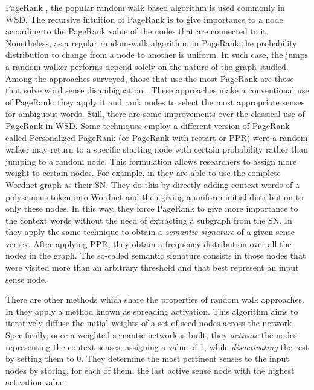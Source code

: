 PageRank \cite{Brin1998}, the popular random walk based algorithm is used commonly in WSD. The recursive intuition of PageRank is to give importance to a node according to the PageRank value of the nodes that are connected to it. %
Nonetheless, as a regular random-walk algorithm, in PageRank the probability distribution to change from a node to another is uniform. In such case, the jumps a random walker performs depend solely on the nature of the graph studied. Among the approaches surveyed, those that use the most PageRank are those that solve word sense disambiguation \cite{2004.Mihalcea.SemanticNetworkPageRank,2006.Agirre.TwoGraph-basedAlgorithms,2007.Navigli.GraphConnectivity,2010.Siberer.GraphCooccurrenceWSD}. 
%
These approaches make a conventional use of PageRank: they apply it and rank nodes to select the most appropriate senses for ambiguous words. Still, there are some improvements over the classical use of PageRank in WSD. Some techniques employ a different version of PageRank called Personalized PageRank (or PageRank with restart \cite{Murphy2012} or PPR) were a random walker may return to a specific starting node with certain probability rather than jumping to a random node. This formulation allows researchers to assign more weight to certain nodes. For example, in \cite{2009.Agirre.PersonalizedPageRankWSD} they are able to use the complete Wordnet graph as their SN. They do this by directly adding context words of a polysemous token into Wordnet and then giving a uniform initial distribution to only these nodes. In this way, they force PageRank to give more importance to the context words without the need of extracting a subgraph from the SN. In \cite{2014.Moro.Navigli.EntityLinking_WSD} they apply the same technique to obtain a \textit{semantic signature} of a given sense vertex. After applying PPR, they obtain a frequency distribution over all the  nodes in the graph. The so-called semantic signature consists in those nodes that were visited more than an arbitrary threshold and that best represent an input sense node.

There are other methods which share the properties of random walk approaches. In  \cite{2007.Tsatsaronis.WSDwithSpreading,2013.Kivimaki.AGraph-BasedApproach} they apply a method known as spreading activation. This algorithm aims to iteratively diffuse the initial weights of a set of seed nodes across the network. Specifically, once a weighted semantic network is built, they \textit{activate}  the nodes representing the context senses, assigning a value of 1, while \textit{disactivating} the rest by setting them to 0. They determine the most pertinent senses to the input nodes by storing, for each of them, the last active sense node with the highest activation value. 

